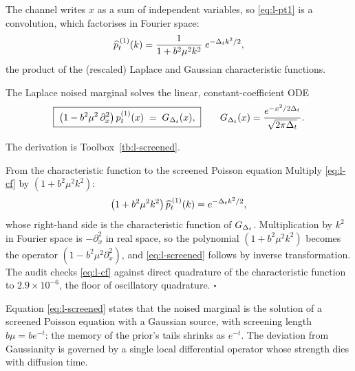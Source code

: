 The channel writes $x$ as a sum of independent variables, so
\eqref{eq:l-pt1} is a convolution, which factorises in Fourier space:
\begin{equation}
  \widehat{p}_t^{\,(1)}(k)
  = \frac{1}{1 + b^2 \mu^2 k^2}\; e^{-\Delta_t k^2/2},
  \label{eq:l-cf}
\end{equation}
the product of the (rescaled) Laplace and Gaussian characteristic
functions.

\begin{theorem}\label{thm:l-screened}
The Laplace noised marginal solves the linear, constant-coefficient ODE
\begin{equation}
  \boxed{\;
  \big( 1 - b^2 \mu^2\, \partial_x^2 \big)\, p_t^{(1)}(x)
  \;=\; G_{\Delta_t}(x),
  \;}
  \qquad
  G_{\Delta_t}(x) = \frac{e^{-x^2/2\Delta_t}}{\sqrt{2\pi \Delta_t}} .
  \label{eq:l-screened}
\end{equation}
\end{theorem}

\noindent The derivation is Toolbox~\ref{tb:l-screened}.

\begin{toolbox}[tb:l-screened]{From the characteristic function to the screened Poisson
equation}
Multiply \eqref{eq:l-cf} by $(1 + b^2\mu^2 k^2)$:
\begin{equation*}
  \big( 1 + b^2 \mu^2 k^2 \big)\, \widehat{p}_t^{\,(1)}(k)
  = e^{-\Delta_t k^2 / 2},
\end{equation*}
whose right-hand side is the characteristic function of $G_{\Delta_t}$.
Multiplication by $k^2$ in Fourier space is $-\partial_x^2$ in real
space, so the polynomial $(1 + b^2\mu^2 k^2)$ becomes the operator
$(1 - b^2\mu^2 \partial_x^2)$, and \eqref{eq:l-screened} follows by
inverse transformation. The audit checks \eqref{eq:l-cf} against direct
quadrature of the characteristic function to $2.9 \times 10^{-6}$, the
floor of oscillatory quadrature. \hfill$\square$
\end{toolbox}

Equation \eqref{eq:l-screened} states that the noised marginal is the
solution of a screened Poisson equation with a Gaussian source, with
screening length $b\mu = b e^{-t}$: the memory of the prior's tails
shrinks as $e^{-t}$. The deviation from Gaussianity is governed by a
single local differential operator whose strength dies with diffusion
time.

